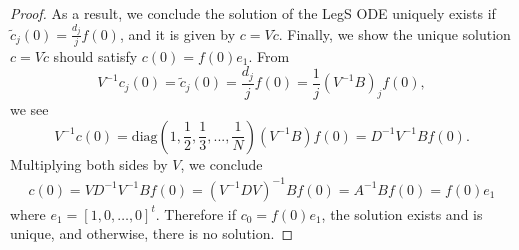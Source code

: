 \documentclass[10pt,a4paper]{amsart}
\newcommand{\pr}[1]{ \left( #1 \right) }
\begin{document}
\begin{proof}
    As a result, we conclude the solution of the LegS ODE uniquely exists if $\tilde{c}_j(0) = \frac{d_j}{j}f(0)$, and it is given by $c = V \tilde{c}$. 
    Finally, we show the unique solution $c = V \tilde{c}$ should satisfy $c(0) = f(0)e_1$.  
    From %
    \[
        V^{-1}c_j(0) = \tilde{c}_j(0) = \frac{d_j}{j}f(0) = \frac{1}{j}(V^{-1}B)_j f(0),
    \]
    we see
    \[
        V^{-1}c(0)  = \text{diag} \pr{ 1, \frac{1}{2}, \frac{1}{3}, ... , \frac{1}{N} } (V^{-1}B) f(0) = D^{-1} V^{-1} B f(0).
    \]
    Multiplying both sides by $V$, we conclude
    \begin{align*}
        c(0) 
        = V D^{-1} V^{-1} B f(0)
        = ( V^{-1} D V )^{-1}Bf(0)
        = A^{-1}B f(0) 
        = f(0)e_1
    \end{align*}
    where $e_1 = [1, 0, \dots, 0] ^{t}$.  
    Therefore if $c_0 = f(0)e_1$, the solution exists and is unique, and otherwise, there is no solution.
\end{proof}
\end{document}
